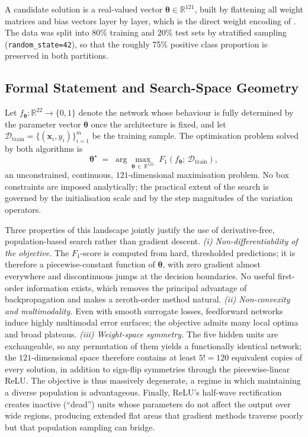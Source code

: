 \documentclass[12pt, a4paper]{article}
\begin{document}
A candidate solution is a real-valued vector $\boldsymbol{\theta} \in \mathbb{R}^{121}$, built by flattening all weight matrices and bias vectors layer by layer, which is the direct weight encoding of \citet{yao1999}. The data was split into 80\% training and 20\% test sets by stratified sampling (\texttt{random\_state=42}), so that the roughly 75\% positive class proportion is preserved in both partitions.

\subsection{Formal Statement and Search-Space Geometry}

Let $f_{\boldsymbol{\theta}}:\mathbb{R}^{22}\to\{0,1\}$ denote the network whose behaviour is fully determined by the parameter vector $\boldsymbol{\theta}$ once the architecture is fixed, and let $\mathcal{D}_{\text{train}}=\{(\mathbf{x}_i,y_i)\}_{i=1}^{m}$ be the training sample. The optimisation problem solved by both algorithms is
\[
\boldsymbol{\theta}^{\star} \;=\; \arg\max_{\boldsymbol{\theta}\,\in\,\mathbb{R}^{121}} \; F_1\!\left(f_{\boldsymbol{\theta}};\,\mathcal{D}_{\text{train}}\right),
\]
an unconstrained, continuous, $121$-dimensional maximisation problem. No box constraints are imposed analytically; the practical extent of the search is governed by the initialisation scale and by the step magnitudes of the variation operators.

Three properties of this landscape jointly justify the use of derivative-free, population-based search rather than gradient descent. \emph{(i) Non-differentiability of the objective.} The $F_1$-score is computed from hard, thresholded predictions; it is therefore a piecewise-constant function of $\boldsymbol{\theta}$, with zero gradient almost everywhere and discontinuous jumps at the decision boundaries. No useful first-order information exists, which removes the principal advantage of backpropagation and makes a zeroth-order method natural. \emph{(ii) Non-convexity and multimodality.} Even with smooth surrogate losses, feedforward networks induce highly multimodal error surfaces; the objective admits many local optima and broad plateaus. \emph{(iii) Weight-space symmetry.} The five hidden units are exchangeable, so any permutation of them yields a functionally identical network; the $121$-dimensional space therefore contains at least $5!=120$ equivalent copies of every solution, in addition to sign-flip symmetries through the piecewise-linear ReLU. The objective is thus massively degenerate, a regime in which maintaining a diverse population is advantageous. Finally, ReLU's half-wave rectification creates inactive (``dead'') units whose parameters do not affect the output over wide regions, producing extended flat areas that gradient methods traverse poorly but that population sampling can bridge.
\end{document}
